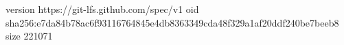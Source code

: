 version https://git-lfs.github.com/spec/v1
oid sha256:e7da84b78ac6f93116764845e4db8363349cda48f329a1af20ddf240be7beeb8
size 221071
